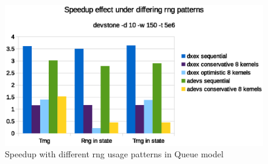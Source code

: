 \begin{figure}
    \center

    \includegraphics[width=\modelfraction\columnwidth]{fig/rngspeedupeffectdevstone.eps}
    \caption{Speedup with different rng usage patterns in Queue model}
    \label{fig:Queuerngspeedup}

\end{figure}
